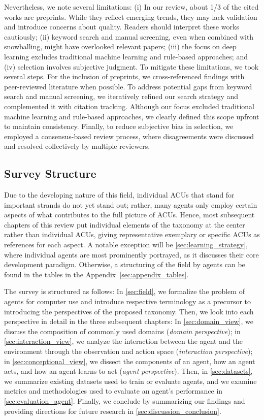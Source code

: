 Nevertheless, we note several limitations: (i) In our review, about 1/3 of the cited works are preprints. While they reflect emerging trends, they may lack validation and introduce concerns about quality. Readers should interpret these works cautiously; (ii) keyword search and manual screening, even when combined with snowballing, might have overlooked relevant papers; (iii) the focus on deep learning excludes traditional machine learning and rule-based approaches; and (iv) selection involves subjective judgment. To mitigate these limitations, we took several steps. For the inclusion of preprints, we cross-referenced findings with peer-reviewed literature when possible. To address potential gaps from keyword search and manual screening, we iteratively refined our search strategy and complemented it with citation tracking. Although our focus excluded traditional machine learning and rule-based approaches, we clearly defined this scope upfront to maintain consistency. Finally, to reduce subjective bias in selection, we employed a consensus-based review process, where disagreements were discussed and resolved collectively by multiple reviewers.

\subsection{Survey Structure}

Due to the developing nature of this field, individual ACUs that stand for important strands do not yet stand out; rather, many agents only employ certain aspects of what contributes to the full picture of ACUs. Hence, most subsequent chapters of this review put individual elements of the taxonomy at the center rather than individual ACUs, giving representative exemplary or specific ACUs as references for each aspect. A notable exception will be \cref{sec:learning_strategy}, where individual agents are most prominently portrayed, as it discusses their core development paradigm. Otherwise, a structuring of the field by agents can be found in the tables in the Appendix~\ref{sec:appendix_tables}. 

The survey is structured as follows: In \cref{sec:field}, we formalize the problem of agents for computer use and introduce respective terminology as a precursor to introducing the perspectives of the proposed taxonomy. Then, we look into each perspective in detail in the three subsequent chapters:
In \cref{sec:domain_view}, we discuss the composition of commonly used domains (\emph{domain perspective});
in \cref{sec:interaction_view}, we analyze the interaction between the agent and the environment through the observation and action space (\emph{interaction perspective}); 
in \cref{sec:conceptional_view}, we dissect the components of an agent, how an agent acts, and how an agent learns to act (\emph{agent perspective}). 
Then, in \cref{sec:datasets}, we summarize existing datasets used to train or evaluate agents, and we examine metrics and methodologies used to evaluate an agent's performance in \cref{sec:evaluation_agent}.
Finally, we conclude by summarizing our findings and providing directions for future research in \cref{sec:discussion_conclusion}.

